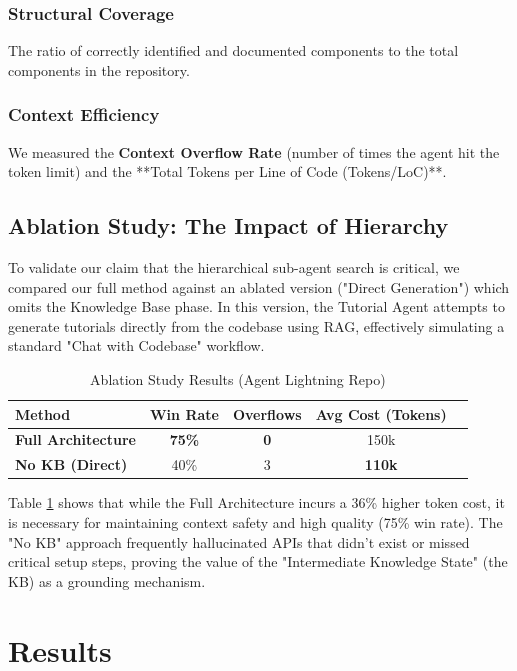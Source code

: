 \documentclass[conference]{IEEEtran}
\begin{document}
\subsubsection{Structural Coverage}
The ratio of correctly identified and documented components to the total components in the repository.

\subsubsection{Context Efficiency}
We measured the \textbf{Context Overflow Rate} (number of times the agent hit the token limit) and the **Total Tokens per Line of Code (Tokens/LoC)**.

\subsection{Ablation Study: The Impact of Hierarchy}
To validate our claim that the hierarchical sub-agent search is critical, we compared our full method against an ablated version ("Direct Generation") which omits the Knowledge Base phase. In this version, the Tutorial Agent attempts to generate tutorials directly from the codebase using RAG, effectively simulating a standard "Chat with Codebase" workflow.

\begin{table}[htbp]
\caption{Ablation Study Results (Agent Lightning Repo)}
\begin{center}
\begin{tabular}{@{}lcccc@{}}
\toprule
\textbf{Method} & \textbf{Win Rate} & \textbf{Overflows} & \textbf{Avg Cost (Tokens)} \\ \midrule
\textbf{Full Architecture} & \textbf{75\%} & \textbf{0} & 150k \\
\textbf{No KB (Direct)} & 40\% & 3 & \textbf{110k} \\ \bottomrule
\end{tabular}
\end{center}
\label{tab:ablation}
\end{table}

Table \ref{tab:ablation} shows that while the Full Architecture incurs a 36\% higher token cost, it is necessary for maintaining context safety and high quality (75\% win rate). The "No KB" approach frequently hallucinated APIs that didn't exist or missed critical setup steps, proving the value of the "Intermediate Knowledge State" (the KB) as a grounding mechanism.

\section{Results}
\end{document}
